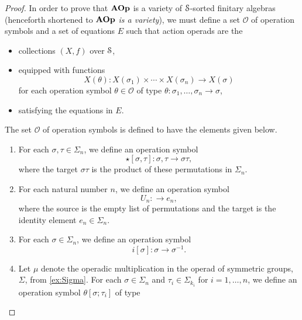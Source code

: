 
\begin{proof}
In order to prove that $\mathbf{AOp}$ is a variety of $\mathcal{S}$-sorted finitary algebras (henceforth shortened to \emph{$\mathbf{AOp}$ is a variety}), we must define a set $\mathcal{O}$ of operation symbols and a set of equations $E$ such that action operads are the 
\begin{itemize}
\item collections $(X, f)$ over $\mathcal{S}$, 
\item equipped with functions
\[
X(\theta) \colon X(\sigma_1) \times \cdots \times X(\sigma_n) \to X(\sigma)
\]
for each operation symbol $\theta \in \mathcal{O}$ of type $\theta \colon \sigma_1, \ldots, \sigma_n \to \sigma$,
\item satisfying the equations in $E$.
\end{itemize}
The set $\mathcal{O}$ of operation symbols is defined to have the elements given below.
\begin{enumerate}
\item For each $\sigma, \tau \in \Sigma_n$, we define an operation symbol
\[
\star[\sigma, \tau] \colon \sigma, \tau \to \sigma \tau,
\]
where the target $\sigma \tau$ is the product of these permutations in $\Sigma_n$.
\item For each natural number $n$, we define an operation symbol
\[
U_n \colon \to e_n,
\]
where the source is the empty list of permutations and the target is the identity element $e_n \in \Sigma_n$.
\item For each $\sigma \in \Sigma_n$, we define an operation symbol
\[
i[\sigma] \colon \sigma \to \sigma^{-1}.
\]
\item Let $\mu$ denote the operadic multiplication in the operad of symmetric groups, $\Sigma$, from \cref{ex:Sigma}. For each $\sigma \in \Sigma_n$ and $\tau_i \in \Sigma_{k_i}$ for $i=1, \ldots, n$, we define an operation symbol $\theta[\sigma; \tau_i]$ of type

\end{enumerate}
\end{proof}
